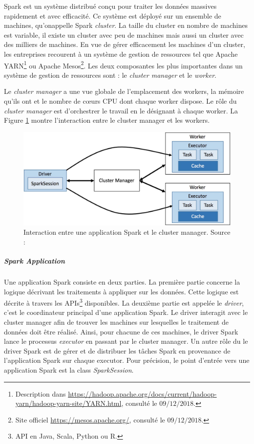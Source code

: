 Spark est un système distribué conçu pour traiter les données massives rapidement et avec efficacité. Ce système est déployé sur un ensemble de machines, qu'onappelle Spark \textit{cluster}. La taille du cluster en nombre de machines est variable, il existe un cluster avec peu de machines mais aussi un cluster avec des milliers de machines. En vue de gérer efficacement les machines d'un cluster, les entreprises recourent à un système de gestion de ressources tel que Apache YARN\footnote{Description dans \url{https://hadoop.apache.org/docs/current/hadoop-yarn/hadoop-yarn-site/YARN.html}, consulté le $09/12/2018$.} ou Apache Mesos\footnote{Site officiel \url{https://mesos.apache.org/}, consulté le $09/12/2018$.}. Les deux composantes les plus importantes dans un système de gestion de ressources sont : le \textit{cluster manager} et le \textit{worker}.

Le \textit{cluster manager} a une vue globale de l'emplacement des workers, la mémoire qu'ils ont et le nombre de c\oe{}urs CPU dont chaque worker dispose. Le rôle du \textit{cluster manager} est d'orchestrer le travail en le désignant à chaque worker. La Figure \ref{fig:cluster-overview} montre l'interaction entre le cluster manager et les workers.


\begin{figure}[H]
	\centering
	\captionsetup{justification= centering}
	\includegraphics[width=0.7\linewidth]{illustrations/cluster-overview.jpg}
	\caption{ Interaction entre une application Spark et le cluster manager. Source : \cite{eginning-Apache-Spark-2-cluster-overwiew}}
	\label{fig:cluster-overview}
\end{figure}




\subparagraph{Spark Application}
Une application Spark consiste en deux parties. La première partie concerne la logique décrivant les traitements à appliquer sur les données.  Cette logique est décrite à travers les APIs\footnote{API en Java, Scala, Python ou R.} disponibles. La deuxième partie est appelée le \textit{driver}, c'est le coordinateur principal d'une application Spark. Le driver interagit avec le cluster manager afin de trouver les machines sur lesquelles le traitement de données doit être réalisé. Ainsi, pour chacune de ces machines, le driver Spark lance le processus \textit{executor} en passant par le cluster manager. Un autre rôle du le driver Spark est de gérer et de distribuer les tâches Spark en provenance de l'application Spark sur chaque executor. Pour précision, le point d'entrée vers une application Spark est la class \textit{SparkSession}.

